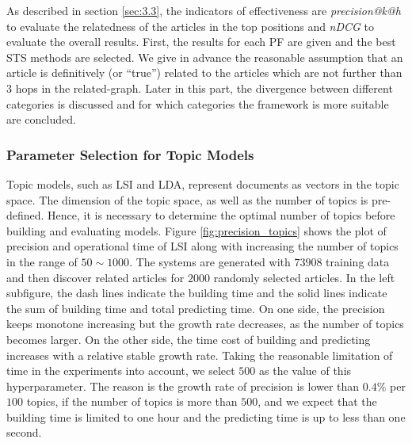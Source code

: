 As described in section \ref{sec:3.3}, the indicators of effectiveness are \textit{precision@k@h} to evaluate the relatedness of the articles in the top positions and \textit{nDCG} to evaluate the overall results. First, the results for each PF are given and the best STS methods are selected. We give in advance the reasonable assumption that an article is definitively (or ``true'') related to the articles which are not further than $3$ hops in the related-graph. Later in this part, the divergence between different categories is discussed and for which categories the framework is more suitable are concluded.  


\subsubsection{Parameter Selection for Topic Models}

Topic models, such as LSI and LDA, represent documents as vectors in the topic space. The dimension of the topic space, as well as the number of topics is pre-defined. Hence, it is necessary to determine the optimal number of topics before building and evaluating models. Figure \ref{fig:precision_topics} shows the plot of precision and operational time of LSI along with increasing the number of topics in the range of $50 \sim 1000$. The systems are generated with $73908$ training data and then discover related articles for $2000$ randomly selected articles. In the left subfigure, the dash lines indicate the building time and the solid lines indicate the sum of building time and total predicting time. On one side, the precision keeps monotone increasing  but the growth rate decreases, as the number of topics becomes larger. On the other side, the time cost of building and predicting increases with a relative stable growth rate. Taking the reasonable limitation of time in the experiments into account, we select $500$ as the value of this hyperparameter. The reason is the growth rate of precision is lower than $0.4\%$ per $100$ topics, if the number of topics is more than $500$, and we expect that the building time is limited to one hour and the predicting time is up to less than one second. 

\clearpage


